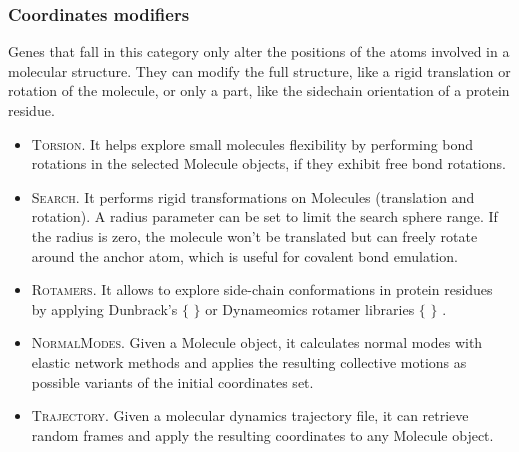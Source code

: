 \subsubsection{Coordinates modifiers}
Genes that fall in this category only alter the positions of the atoms involved in a molecular structure. They can modify the full structure, like a rigid translation or rotation of the molecule, or only a part, like the sidechain orientation of a protein residue.

\begin{itemize}
	\item \textsc{Torsion}. It helps explore small molecules flexibility by performing bond rotations in the selected Molecule objects, if they exhibit free bond rotations.

	\item \textsc{Search}. It performs rigid transformations on Molecules (translation and rotation). A radius parameter can be set to limit the search sphere range. If the radius is zero, the molecule won’t be translated but can freely rotate around the anchor atom, which is useful for covalent bond emulation.

	\item \textsc{Rotamers}. It allows to explore side-chain conformations in protein residues by applying Dunbrack’s $ \{ $ $ \} $  or Dynameomics rotamer libraries $ \{ $ $ \} $ .

	\item \textsc{NormalModes}. Given a Molecule object, it calculates normal modes with elastic network methods and applies the resulting collective motions as possible variants of the initial coordinates set.

	\item \textsc{Trajectory}. Given a molecular dynamics trajectory file, it can retrieve random frames and apply the resulting coordinates to any Molecule object.
\end{itemize}


